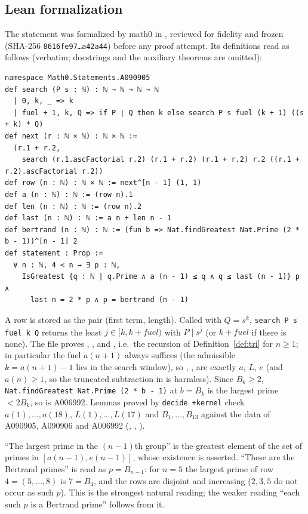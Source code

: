 \documentclass[11pt]{amsart}
\theoremstyle{plain}
\theoremstyle{definition}
\newcommand{\rf}[2]{#1^{\overline{#2}}}
\begin{document}
\subsection*{Lean formalization}
The statement was formalized by math0 in , reviewed for fidelity and frozen (SHA-256 \texttt{8616fe97\ldots a42a44}) before any proof attempt. Its definitions read as follows (verbatim; docstrings and the auxiliary theorems are omitted):
\begin{lstlisting}
namespace Math0.Statements.A090905
def search (P s : ℕ) : ℕ → ℕ → ℕ → ℕ
  | 0, k, _ => k
  | fuel + 1, k, Q => if P ∣ Q then k else search P s fuel (k + 1) ((s + k) * Q)
def next (r : ℕ × ℕ) : ℕ × ℕ :=
  (r.1 + r.2,
    search (r.1.ascFactorial r.2) (r.1 + r.2) (r.1 + r.2) r.2 ((r.1 + r.2).ascFactorial r.2))
def row (n : ℕ) : ℕ × ℕ := next^[n - 1] (1, 1)
def a (n : ℕ) : ℕ := (row n).1
def len (n : ℕ) : ℕ := (row n).2
def last (n : ℕ) : ℕ := a n + len n - 1
def bertrand (n : ℕ) : ℕ := (fun b => Nat.findGreatest Nat.Prime (2 * b - 1))^[n - 1] 2
def statement : Prop :=
  ∀ n : ℕ, 4 < n → ∃ p : ℕ,
    IsGreatest {q : ℕ | q.Prime ∧ a (n - 1) ≤ q ∧ q ≤ last (n - 1)} p ∧
      last n = 2 * p ∧ p = bertrand (n - 1)
\end{lstlisting}
A row is stored as the pair (first term, length). Called with $Q=\rf{s}{k}$, \lstinline|search P s fuel k Q| returns the least $j\in[k,k+\mathit{fuel})$ with $P\mid\rf{s}{j}$ (or $k+\mathit{fuel}$ if there is none). The file proves , ,  and , i.e.\ the recursion of Definition~\ref{def:tri} for $n\ge1$; in particular the fuel $a(n+1)$ always suffices (the admissible $k=a(n+1)-1$ lies in the search window), so , ,  are exactly $a$, $L$, $e$ (and $a(n)\ge1$, so the truncated subtraction in  is harmless). Since $B_k\ge2$, \lstinline|Nat.findGreatest Nat.Prime (2 * b - 1)| at $b=B_k$ is the largest prime $<2B_k$, so  is A006992. Lemmas proved by \texttt{decide +kernel} check $a(1),\dots,a(18)$, $L(1),\dots,L(17)$ and $B_1,\dots,B_{13}$ against the data of A090905, A090906 and A006992 (, , ).

``The largest prime in the $(n-1)$th group'' is the greatest element of the set of primes in $[a(n-1),e(n-1)]$, whose existence is asserted. ``These are the Bertrand primes'' is read as $p=B_{n-1}$: for $n=5$ the largest prime of row $4=(5,\dots,8)$ is $7=B_4$, and the rows are disjoint and increasing ($2,3,5$ do not occur as such $p$). This is the strongest natural reading; the weaker reading ``each such $p$ is a Bertrand prime'' follows from it.
\end{document}
